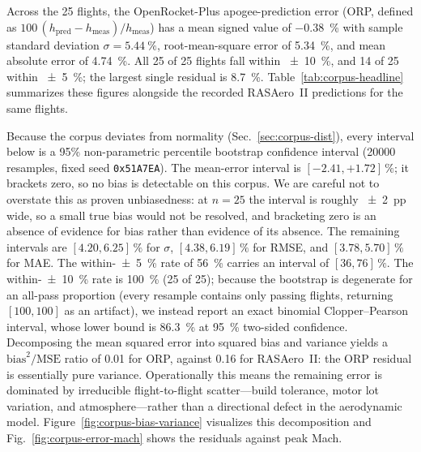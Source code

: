 Across the \num{25} flights, the OpenRocket-Plus apogee-prediction error (ORP,
defined as $100\,(h_\text{pred}-h_\text{meas})/h_\text{meas}$) has a mean signed
value of \SI{-0.38}{\percent} with sample standard deviation
$\sigma=\SI{5.44}{\percent}$, root-mean-square error of \SI{5.34}{\percent}, and
mean absolute error of \SI{4.74}{\percent}. All \num{25} of \num{25} flights
fall within \SI{\pm 10}{\percent}, and \num{14} of \num{25} within
\SI{\pm 5}{\percent}; the largest single residual is \SI{8.7}{\percent}.
Table~\ref{tab:corpus-headline} summarizes these figures alongside the recorded
RASAero~II predictions for the same flights.

Because the corpus deviates from normality (Sec.~\ref{sec:corpus-dist}), every
interval below is a 95\% non-parametric percentile bootstrap confidence
interval (\num{20000} resamples, fixed seed \texttt{0x51A7EA}). The mean-error
interval is $[-2.41,+1.72]\,\si{\percent}$; it brackets zero, so no bias is
detectable on this corpus. We are careful not to overstate this as proven
unbiasedness: at $n=25$ the interval is roughly \SI{\pm 2}{pp} wide, so a small
true bias would not be resolved, and bracketing zero is an absence of evidence
for bias rather than evidence of its absence. The remaining intervals are
$[4.20,6.25]\,\si{\percent}$ for $\sigma$, $[4.38,6.19]\,\si{\percent}$ for RMSE,
and $[3.78,5.70]\,\si{\percent}$ for MAE. The within-\SI{\pm 5}{\percent} rate of
\SI{56}{\percent} carries an interval of $[36,76]\,\si{\percent}$. The
within-\SI{\pm 10}{\percent} rate is \SI{100}{\percent} (\num{25} of
\num{25}); because the bootstrap is degenerate for an all-pass proportion
(every resample contains only passing flights, returning $[100,100]$ as an
artifact), we instead report an exact binomial Clopper--Pearson interval,
whose lower bound is \SI{86.3}{\percent} at \SI{95}{\percent} two-sided
confidence. Decomposing the mean
squared error into squared bias and variance yields a $\text{bias}^2/\text{MSE}$
ratio of \num{0.01} for ORP, against \num{0.16} for RASAero~II: the ORP residual
is essentially pure variance. Operationally this means the remaining error is
dominated by irreducible flight-to-flight scatter---build tolerance, motor lot
variation, and atmosphere---rather than a directional defect in the
aerodynamic model. Figure~\ref{fig:corpus-bias-variance} visualizes this
decomposition and Fig.~\ref{fig:corpus-error-mach} shows the residuals against
peak Mach.

